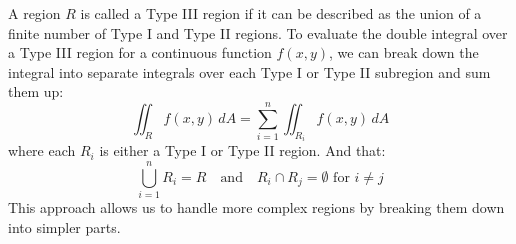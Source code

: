 \documentclass[11pt]{report}
\begin{document}
\begin{definition}
    A region $R$ is called a Type III region if it can be described as the union of a finite number of Type I and Type II regions. To evaluate the double integral over a Type III region for a continuous function $f(x,y)$, we can break down the integral into separate integrals over each Type I or Type II subregion and sum them up:
    \begin{equation}
        \iint_R f(x,y) \, dA = \sum_{i=1}^n \iint_{R_i} f(x,y) \, dA
    \end{equation}
    where each $R_i$ is either a Type I or Type II region. And that:
    $$
        \bigcup_{i=1}^n R_i = R \quad \text{and} \quad R_i \cap R_j = \emptyset \text{ for } i \neq j
    $$
    This approach allows us to handle more complex regions by breaking them down into simpler parts.
\end{definition}
\end{document}
